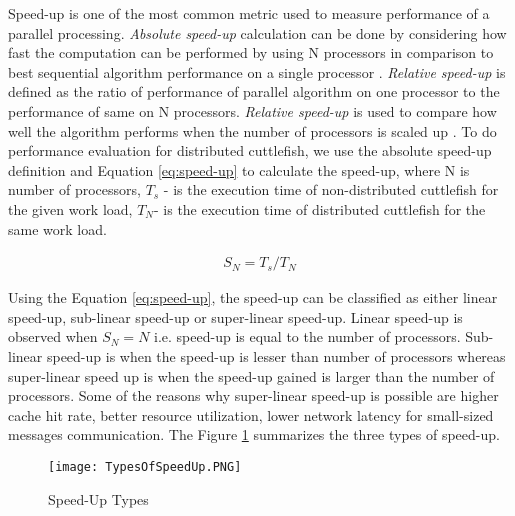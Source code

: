 Speed-up is one of the most common metric used to measure performance of a parallel processing. \textit{Absolute speed-up} calculation can be done by considering how fast the computation can be performed by using N processors in comparison to best sequential algorithm performance on a single processor \cite{Speedup}. \textit{Relative speed-up }is defined as the ratio of performance of parallel algorithm on one processor to the performance of same on N processors. \textit{Relative speed-up} is used to compare how well the algorithm performs when the number of processors is scaled up \cite{Speedup}. To do performance evaluation for distributed cuttlefish, we use the absolute speed-up definition and Equation \ref{eq:speed-up} to calculate the speed-up, where N is number of processors, \begin{math} T_{s} \end{math} - is the execution time of non-distributed cuttlefish for the given work load, \begin{math} T_{N}\end{math}- is the execution time of distributed cuttlefish for the same work load.

\begin{equation}
\label{eq:speed-up}
\begin{aligned}
S_{N} = T_{s}/T_{N}
\end{aligned}
\end{equation}

Using the Equation \ref{eq:speed-up}, the speed-up can be classified as either linear speed-up, sub-linear speed-up or super-linear speed-up. Linear speed-up is observed when \begin{math}S_{N}=N \end{math} i.e. speed-up is equal to the number of processors. Sub-linear speed-up is when the speed-up is lesser than number of processors whereas super-linear speed up is when the speed-up gained is larger than the number of processors. Some of the reasons why super-linear speed-up is possible are higher cache hit rate, better resource utilization, lower network latency for small-sized messages communication. The Figure \ref{fig:TypesOfSpeedUp} summarizes the three types of speed-up.\newline 

\begin{figure}[t]
\centering
\texttt{[image: TypesOfSpeedUp.PNG]}
\caption{Speed-Up Types}
\label{fig:TypesOfSpeedUp}
\end{figure}

